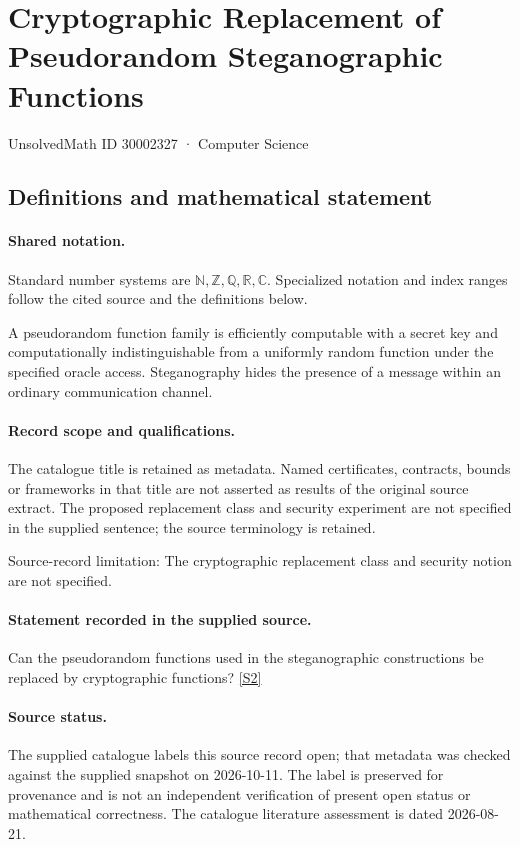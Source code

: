 \documentclass[11pt]{article}
\newcommand{\sref}[2]{\hyperlink{source:#1:#2}{[S#2]}}
\begin{document}
\setcounter{section}{30002326}
\section{Cryptographic Replacement of Pseudorandom Steganographic Functions}\label{30002327}
{\small\sffamily UnsolvedMath ID 30002327 · Computer Science}
\subsection{Definitions and mathematical statement}

\paragraph{Shared notation.}Standard number systems are $\mathbb N,\mathbb Z,\mathbb Q,\mathbb R,\mathbb C$. Specialized notation and index ranges follow the cited source and the definitions below.


A pseudorandom function family is efficiently computable with a secret key and computationally indistinguishable from a uniformly random function under the specified oracle access. Steganography hides the presence of a message within an ordinary communication channel.
\paragraph{Record scope and qualifications.}
The catalogue title is retained as metadata. Named certificates, contracts, bounds or frameworks in that title are not asserted as results of the original source extract.
The proposed replacement class and security experiment are not specified in the supplied sentence; the source terminology is retained.

Source-record limitation: The cryptographic replacement class and security notion are not specified.
\paragraph{Statement recorded in the supplied source.}
Can the pseudorandom functions used in the steganographic constructions be replaced by cryptographic functions? \sref{30002327}{2}
\paragraph{Source status.}
The supplied catalogue labels this source record open; that metadata was checked against the supplied snapshot on 2026-10-11. The label is preserved for provenance and is not an independent verification of present open status or mathematical correctness. The catalogue literature assessment is dated 2026-08-21.
\end{document}
